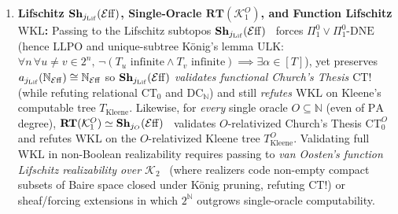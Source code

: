 \begin{theorem}
\begin{enumerate}
  \item \textbf{Lifschitz $\mathbf{Sh}_{j_{\mathrm{Lif}}}(\mathcal{E}\mathrm{ff})$, Single-Oracle $\mathbf{RT}(\mathcal{K}_1^O)$, and Function Lifschitz $\mathrm{WKL}$:} Passing to the Lifschitz subtopos $\mathbf{Sh}_{j_{\mathrm{Lif}}}(\mathcal{E}\mathrm{ff})$~\cite[\S 4.4]{vanOosten08} forces $\Pi^0_1 \lor \Pi^0_1\text{-}\mathrm{DNE}$ (hence $\mathrm{LLPO}$ and unique-subtree K\"onig's lemma $\mathrm{ULK}$: $\forall n\,\forall u \neq v \in 2^n,\, \neg(T_u\text{ infinite} \wedge T_v\text{ infinite}) \implies \exists \alpha \in [T]$), yet preserves $a_{j_{\mathrm{Lif}}}(\mathbb{N}_{\mathcal{E}\mathrm{ff}}) \cong \mathbb{N}_{\mathcal{E}\mathrm{ff}}$ so $\mathbf{Sh}_{j_{\mathrm{Lif}}}(\mathcal{E}\mathrm{ff})$ \emph{validates functional Church's Thesis $\mathrm{CT}!$} (while refuting relational $\mathrm{CT}_0$ and $\mathrm{DC}_{\mathbb{N}}$) and still \emph{refutes $\mathrm{WKL}$} on Kleene's computable tree $T_{\mathrm{Kleene}}$. Likewise, for \emph{every} single oracle $O \subseteq \mathbb{N}$ (even of $\mathrm{PA}$ degree), $\mathbf{RT}(\mathcal{K}_1^O) \simeq \mathbf{Sh}_{j_O}(\mathcal{E}\mathrm{ff})$~\cite{LeeVanOosten13} validates $O$-relativized Church's Thesis $\mathrm{CT}_0^O$ and refutes $\mathrm{WKL}$ on the $O$-relativized Kleene tree $T_{\mathrm{Kleene}}^O$. Validating full $\mathrm{WKL}$ in non-Boolean realizability requires passing to \emph{van Oosten's function Lifschitz realizability over $\mathcal{K}_2$}~\cite[\S 3]{vanOosten90} (where realizers code non-empty compact subsets of Baire space closed under K\"onig pruning, refuting $\mathrm{CT}!$) or sheaf/forcing extensions in which $2^{\mathbb{N}}$ outgrows single-oracle computability.

\end{enumerate}

\end{theorem}

